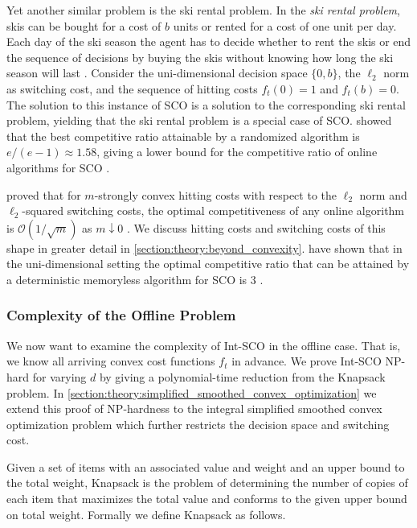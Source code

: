 Yet another similar problem is the ski rental problem. In the \emph{ski rental problem}, skis can be bought for a cost of $b$ units or rented for a cost of one unit per day. Each day of the ski season the agent has to decide whether to rent the skis or end the sequence of decisions by buying the skis without knowing how long the ski season will last \cite{Shah2021}. Consider the uni-dimensional decision space $\{0,b\}$, the $\ell_2$ norm as switching cost, and the sequence of hitting costs $f_t(0) = 1$ and $f_t(b) = 0$. The solution to this instance of SCO is a solution to the corresponding ski rental problem, yielding that the ski rental problem is a special case of SCO. \citeauthor*{Karlin1990} showed that the best competitive ratio attainable by a randomized algorithm is $e/(e-1) \approx 1.58$, giving a lower bound for the competitive ratio of online algorithms for SCO \cite{Karlin1990}.

\citeauthor*{Goel2019} proved that for $m$-strongly convex hitting costs with respect to the $\ell_2$ norm and $\ell_2$-squared switching costs, the optimal competitiveness of any online algorithm is $\mathcal{O}(1/\sqrt{m})$ as $m \downarrow 0$ \cite{Goel2019}. We discuss hitting costs and switching costs of this shape in greater detail in \autoref{section:theory:beyond_convexity}. \citeauthor*{Bansal2015} have shown that in the uni-dimensional setting the optimal competitive ratio that can be attained by a deterministic memoryless algorithm for SCO is 3 \cite{Bansal2015}.

\subsubsection{Complexity of the Offline Problem}

We now want to examine the complexity of Int-SCO in the offline case. That is, we know all arriving convex cost functions $f_t$ in advance. We prove Int-SCO NP-hard for varying $d$ by giving a polynomial-time reduction from the Knapsack problem. In \autoref{section:theory:simplified_smoothed_convex_optimization} we extend this proof of NP-hardness to the integral simplified smoothed convex optimization problem which further restricts the decision space and switching cost.

Given a set of items with an associated value and weight and an upper bound to the total weight, Knapsack is the problem of determining the number of copies of each item that maximizes the total value and conforms to the given upper bound on total weight. Formally we define Knapsack as follows.

